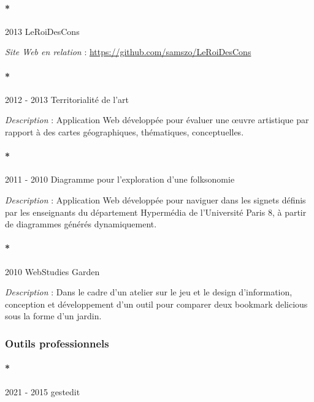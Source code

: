 \documentclass[
  a4paper,
  DIV=11,
  numbers=noendperiod]{scrreprt}
\let\oldparagraph\paragraph
\renewcommand{\paragraph}[1]{\oldparagraph{#1}\mbox{}}
\begin{document}
\paragraph*{2013 LeRoiDesCons}\label{leroidescons}

\emph{Site Web en relation} :
\url{https://github.com/samszo/LeRoiDesCons}

\paragraph*{2012 - 2013 Territorialité de
l'art}\label{territorialituxe9-de-lart}

\emph{Description} : Application Web développée pour évaluer une œuvre
artistique par rapport à des cartes géographiques, thématiques,
conceptuelles.

\paragraph*{2011 - 2010 Diagramme pour l'exploration d'une
folksonomie}\label{sec-item299744}

\emph{Description} : Application Web développée pour naviguer dans les
signets définis par les enseignants du département Hypermédia de
l'Université Paris 8, à partir de diagrammes générés dynamiquement.

\paragraph*{2010 WebStudies Garden}\label{sec-item299746}

\emph{Description} : Dans le cadre d'un atelier sur le jeu et le design
d'information, conception et développement d'un outil pour comparer deux
bookmark delicious sous la forme d'un jardin.

\subsubsection{Outils professionnels}\label{sec-item301733}

\paragraph*{2021 - 2015 gestedit}\label{sec-item301782}
\end{document}
